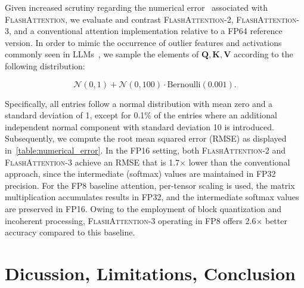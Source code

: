 \begin{enumerate}
Given increased scrutiny regarding the numerical error~\citep{golden2024flash} associated with
\textsc{FlashAttention}, we evaluate and contrast \textsc{FlashAttention-2}, \textsc{FlashAttention-3}, and a conventional attention implementation relative to a FP64 reference version. In order to mimic the occurrence of outlier features and activations commonly seen in LLMs~\citep{dettmers2208llm,
  sun2024massive}, we sample the elements of $\mathbf{Q}, \mathbf{K}, \mathbf{V}$ according to the following distribution:

\begin{equation*}
  \mathcal{N}(0, 1) + \mathcal{N}(0, 100) \cdot \mathrm{Bernoulli}(0.001).
\end{equation*}

Specifically, all entries follow a normal distribution with mean zero and a standard deviation of 1, except for 0.1\% of the entries where an additional independent normal component with standard deviation 10 is introduced. Subsequently, we compute the root mean squared error (RMSE) as displayed in~\cref{table:numerical_error}. In the FP16 setting, both \textsc{FlashAttention-2} and \textsc{FlashAttention-3} achieve an RMSE that is 1.7$\times$ lower than the conventional approach, since the intermediate (softmax) values are maintained in FP32 precision. For the FP8 baseline attention, per-tensor scaling is used, the matrix multiplication accumulates results in FP32, and the intermediate softmax values are preserved in FP16. Owing to the employment of block quantization and incoherent processing, \textsc{FlashAttention-3} operating in FP8 offers 2.6$\times$ better accuracy compared to this baseline.

\section{Dicussion, Limitations, Conclusion}
\label{sec:discussion}


\end{enumerate}
